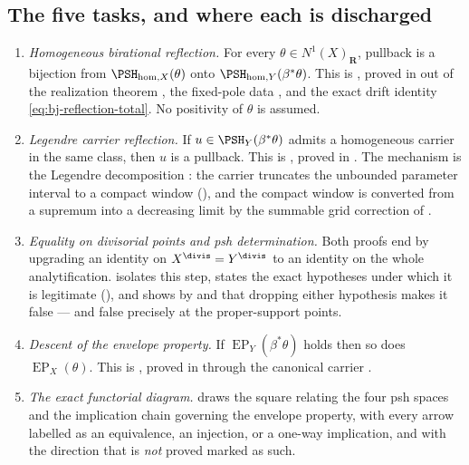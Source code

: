 \subsection{The five tasks, and where each is discharged}
\label{sec:ch39-payoff}

\begin{enumerate}
\item\label{itm:ch39-task:hom}
 \emph{Homogeneous birational reflection.}  For every
 $\theta\in N^1(X)_{\mathbf R}$, pullback is a bijection from
 $\PSH_{\mathrm{hom},X}(\theta)$ onto
 $\PSH_{\mathrm{hom},Y}(\beta^*\theta)$.  This is
 , proved in
  out of the realization theorem
 , the fixed-pole data
 , and the exact drift identity
 \eqref{eq:bj-reflection-total}.  No positivity of $\theta$ is assumed.

\item\label{itm:ch39-task:carrier}
 \emph{Legendre carrier reflection.}  If $u\in\PSH_Y(\beta^*\theta)$
 admits a homogeneous carrier in the same class, then $u$ is a pullback.
 This is , proved in
 .  The mechanism is the Legendre decomposition
 : the carrier truncates the
 unbounded parameter interval to a compact window
 (), and the compact window is converted from a
 supremum into a decreasing limit by the summable grid correction of
 .

\item\label{itm:ch39-task:determination}
 \emph{Equality on divisorial points and psh determination.}  Both proofs
 end by upgrading an identity on $X^{\divis}=Y^{\divis}$ to an identity on
 the whole analytification.   isolates this
 step, states the exact hypotheses under which it is legitimate
 (), and shows by
  and
  that dropping either hypothesis makes it
 false --- and false precisely at the proper-support points.

\item\label{itm:ch39-task:descent}
 \emph{Descent of the envelope property.}  If
 $\operatorname{EP}_Y(\beta^*\theta)$ holds then so does
 $\operatorname{EP}_X(\theta)$.  This is
 , proved in 
 through the canonical carrier .

\item\label{itm:ch39-task:diagram}
 \emph{The exact functorial diagram.}   draws the
 square relating the four psh spaces and the implication chain governing
 the envelope property, with every arrow labelled as an equivalence, an
 injection, or a one-way implication, and with the direction that is
 \emph{not} proved marked as such.
\end{enumerate}

